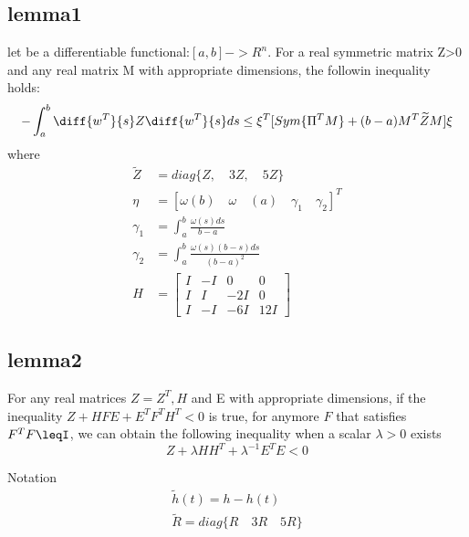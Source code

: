 \documentclass[journal]{IEEEtran}
\begin{document}
 \subsection{lemma1}
 let \omega be a differentiable functional:$[a,b] -> R^n$. For a real symmetric matrix Z>0 and any real matrix M with appropriate
 dimensions, the followin inequality holds:
 \begin{equation}
   -\int _a^b \diff{w^T}{s}Z\diff{w^T}{s}ds \leq \xi ^T[Sym\{\Pi ^T M\}+(b-a)M^T\widetilde{Z}M]\xi
 \end{equation}
 where
 \begin{align}
   \widetilde{Z}&=diag\{Z,\quad 3Z,\quad 5Z\} \\
   \eta&=[\omega (b) \quad \omega \quad (a) \quad \gamma _1 \quad \gamma _2]^T \\
   \gamma _1 &= \int _a ^b \frac{\omega (s)ds}{b-a} \\
   \gamma _2 &= \int _a ^b \frac{\omega (s)(b-s)ds}{(b-a)^2} \\
   H &=
   \begin{bmatrix}
     I& -I &0 &0 \\
     I& I &-2I &0 \\
     I& -I &-6I &12I
   \end{bmatrix}
 \end{align}

 \subsection{lemma2}
 For any real matrices $Z=Z^T, H$ and E with appropriate dimensions, if the inequality $Z +HFE+E^TF^TH^T<0$ is true, for anymore
 $F$ that satisfies $F^TF\leqI$, we can obtain the following inequality when a scalar $\lambda > 0$ exists
 \begin{equation} 
   Z+\lambda HH^T +\lambda ^{-1}E^TE<0
 \end{equation}

 Notation
 \begin{align}
   \widetilde{h}(t) = h-h(t) \\
   \widetilde{R}=diag\{R \quad 3R \quad 5R\}
 \end{align} 
\end{document}

